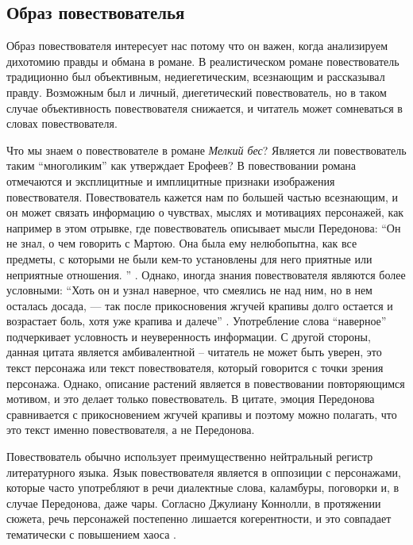 \documentclass[12pt,a4paper]{article}
\begin{document}

\subsection{Образ повествователья}


Образ повествователя интересует нас потому что он важен, когда анализируем дихотомию правды и обмана в романе. В реалистическом романе повествователь традиционно был объективным, недиегетическим, всезнающим и рассказывал правду. Возможным был и личный, диегетический повествователь, но в таком случае объективность повествователя снижается, и читатель может сомневаться в словах повествователя. 


Что мы знаем о повествователе в романе \emph{Мелкий бес}?
Является ли повествователь таким \enquote{многоликим} как утверждает Ерофеев? В повествовании романа отмечаются и эксплицитные и имплицитные признаки изображения повествователя. Повествователь кажется нам по большей частью всезнающим, и он может связать информацию о чувствах, мыслях и мотивациях персонажей, как например в этом отрывке, где повествователь описывает мысли Передонова:  \enquote{Он не знал, о чем говорить с Мартою. Она была ему нелюбопытна,
как все предметы, с которыми не были кем-то установлены для него
приятные или неприятные отношения.
} \parencite[18]{sologub2004}. Однако, иногда знания повествователя являются более условными: \enquote{Хоть он и узнал наверное, что смеялись не над ним, но в нем осталась досада, — так после прикосновения жгучей крапивы долго остается и  возрастает боль, хотя уже крапива и далече} \parencite[19]{sologub2004}. Употребление слова \enquote{наверное} подчеркивает условность и неуверенность информации. С другой стороны, данная цитата является амбивалентной – читатель не может быть уверен, это текст персонажа или текст повествователя, который говорится с точки зрения персонажа. Однако, описание растений является в повествовании повторяющимся мотивом, и это делает только повествователь. В цитате, эмоция Передонова сравнивается с прикосновением жгучей крапивы и поэтому можно полагать, что это текст именно повествователя, а не Передонова.

Повествователь обычно использует преимущественно нейтральный регистр литературного языка. Язык повествователя является в оппозиции с персонажами, которые часто употребляют в речи диалектные слова, каламбуры, поговорки и, в случае Передонова, даже чары. Согласно Джулиану Коннолли, в протяжении сюжета, речь персонажей постепенно лишается когерентности, и это совпадает тематически с повышением хаоса \parencite[358--359]{connolly1981}.
\end{document}
